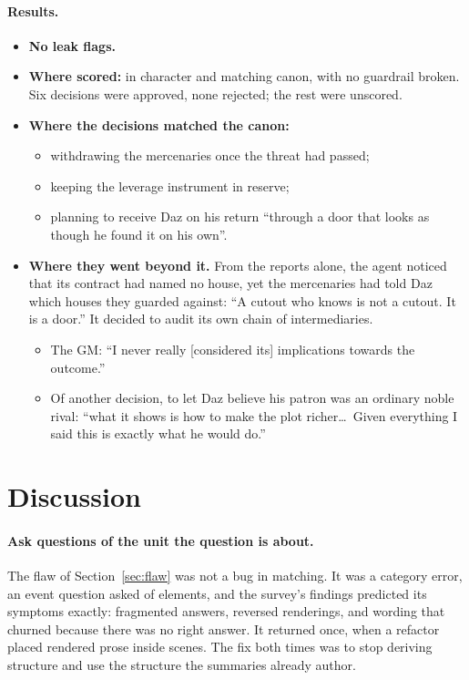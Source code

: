 \documentclass[11pt]{article}
\begin{document}
\paragraph{Results.}
\begin{itemize}[nosep]
\item \textbf{No leak flags.}
\item \textbf{Where scored:} in character and matching canon, with no guardrail
broken. Six decisions were approved, none rejected; the rest were unscored.
\item \textbf{Where the decisions matched the canon:}
\begin{itemize}[nosep]
\item withdrawing the mercenaries once the threat had passed;
\item keeping the leverage instrument in reserve;
\item planning to receive Daz on his return ``through a door that looks as though he
found it on his own''.
\end{itemize}
\item \textbf{Where they went beyond it.} From the reports alone, the agent noticed
that its contract had named no house, yet the mercenaries had told Daz which houses
they guarded against: ``A cutout who knows is not a cutout. It is a door.'' It
decided to audit its own chain of intermediaries.
\begin{itemize}[nosep]
\item The GM: ``I never really [considered its] implications towards the outcome.''
\item Of another decision, to let Daz believe his patron was an ordinary noble rival:
``what it shows is how to make the plot richer\ldots\ Given everything I said this
is exactly what he would do.''
\end{itemize}
\end{itemize}

\section{Discussion}\label{sec:discussion}

\paragraph{Ask questions of the unit the question is about.}
The flaw of Section~\ref{sec:flaw} was not a bug in matching. It was a category error,
an event question asked of elements, and the survey's findings predicted its symptoms
exactly: fragmented answers, reversed renderings, and wording that churned because
there was no right answer. It returned once, when a refactor placed rendered prose
inside scenes. The fix both times was to stop deriving structure and use the structure
the summaries already author.
\end{document}
